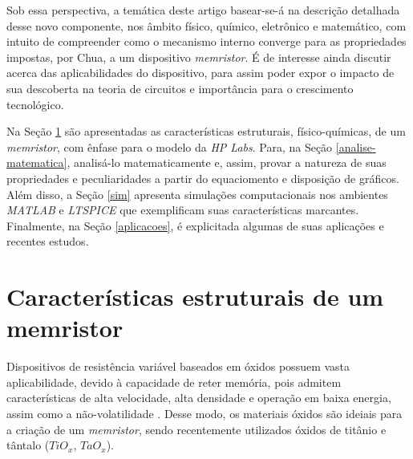 \documentclass{ceel}
\begin{document}
\begin{multicols}{2}

Sob essa perspectiva, a temática deste artigo basear-se-á na descrição detalhada desse novo componente, nos âmbito físico, químico, eletrônico e matemático, com intuito de compreender como o mecanismo interno converge para as propriedades impostas,  por Chua, a um dispositivo \emph{memristor}. É de interesse ainda discutir acerca das aplicabilidades do dispositivo, para assim poder expor o impacto de sua descoberta na teoria de circuitos e importância para o crescimento tecnológico. %

Na Seção \ref{estrutura} são apresentadas as características estruturais, físico-químicas, de um \emph{memristor}, com ênfase para o modelo da \emph{HP Labs}. Para, na Seção \ref{analise-matematica}, analisá-lo matematicamente e, assim, provar a natureza de suas propriedades e peculiaridades a partir do equaciomento e disposição de gráficos. Além disso, a Seção \ref{sim} apresenta simulações computacionais nos ambientes \emph{MATLAB} e \emph{LTSPICE} que exemplificam suas características marcantes. Finalmente, na Seção \ref{aplicacoes}, é explicitada algumas de suas aplicações e recentes estudos.


\section{Características estruturais de um memristor} \label{estrutura}
Dispositivos de resistência variável baseados em óxidos 
possuem vasta aplicabilidade, devido à capacidade de reter memória, pois
admitem características de alta velocidade, alta densidade e operação em baixa energia, 
assim como a não-volatilidade \cite{conceito}. Desse modo, os materiais óxidos são ideiais para a criação de um \emph{memristor}, sendo recentemente utilizados óxidos de titânio e tântalo ($TiO_x$, $TaO_x$)\cite{us}.

\begin{figure}[H]
\centering


\end{figure}
\end{multicols}
\end{document}
